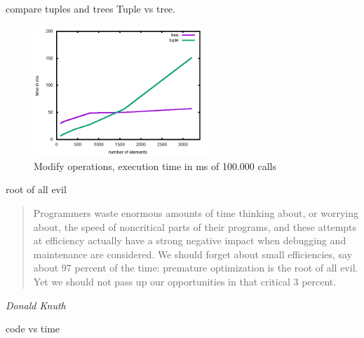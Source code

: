 \begin{frame}{compare tuples and trees}
 Tuple vs tree.
 \begin{figure}
  \centering
  \includegraphics[height=140pt]{comp.png}
  \caption{Modify operations, execution time in ms of 100.000 calls}
 \end{figure}

\end{frame}

\begin{frame}{root of all evil}

\begin{quote}
Programmers waste enormous amounts of time thinking about, or
worrying about, the speed of noncritical parts of their programs, and
these attempts at efficiency actually have a strong negative impact
when debugging and maintenance are considered. We should forget about
small efficiencies, say about 97 percent of the time: premature
optimization is the root of all evil. Yet we should not pass up our
opportunities in that critical 3 percent.
\end{quote}

 {\em Donald Knuth}


\end {frame}

\begin{frame}{code vs time}

\end{frame}

